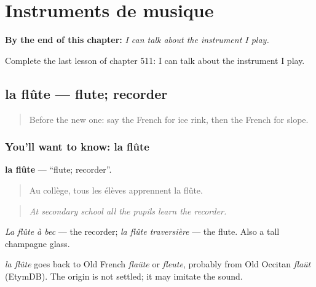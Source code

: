 
\chapter{Instruments de musique}
\label{ch:fr-instruments-de-musique}

\begin{chapteropening}
\textbf{By the end of this chapter:} \emph{I can talk about the instrument I play.}

Complete the last lesson of chapter 511: I can talk about the instrument I play.
\end{chapteropening}

\section[la flûte]{la flûte — flute; recorder}

\label{lesson:FR-C511-flute}



\begin{quote}
Before the new one: say the French for ice rink, then the French for slope.
\end{quote}

\subsection*{You'll want to know: la flûte}
\textbf{la flûte} — \textquotedblleft{}flute; recorder\textquotedblright{}.

\begin{quote}
Au collège, tous les élèves apprennent la flûte.
\end{quote}

\begin{quote}
\emph{At secondary school all the pupils learn the recorder.}
\end{quote}

\emph{La flûte à bec} — the recorder; \emph{la flûte traversière} — the flute. Also a tall champagne glass.

\begin{cousinweb}
\emph{la flûte} goes back to Old French \emph{flaüte} or \emph{fleute}, probably from Old Occitan \emph{flaüt} (EtymDB). The origin is not settled; it may imitate the sound.
\end{cousinweb}

